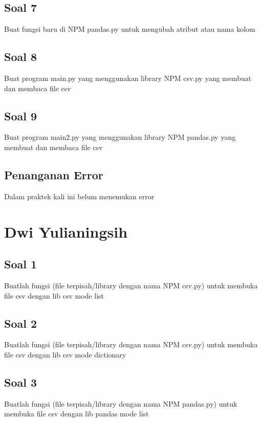\subsection{Soal 7}
Buat fungsi baru di NPM pandas.py untuk mengubah atribut atau nama kolom


\subsection{Soal 8}
Buat program main.py yang menggunakan library NPM csv.py yang membuat dan membaca file csv


\subsection{Soal 9}
Buat program main2.py yang menggunakan library NPM pandas.py yang membuat dan membaca file csv


\subsection{Penanganan Error}
Dalam praktek kali ini belum menemukan error

\section{Dwi Yulianingsih}
\subsection{Soal 1}
Buatlah fungsi (file terpisah/library dengan nama NPM csv.py) untuk membuka file csv dengan lib csv mode list



\subsection{Soal 2}
Buatlah fungsi (file terpisah/library dengan nama NPM csv.py) untuk membuka file csv dengan lib csv mode dictionary


\subsection{Soal 3}
Buatlah fungsi (file terpisah/library dengan nama NPM pandas.py) untuk membuka file csv dengan lib pandas mode list


